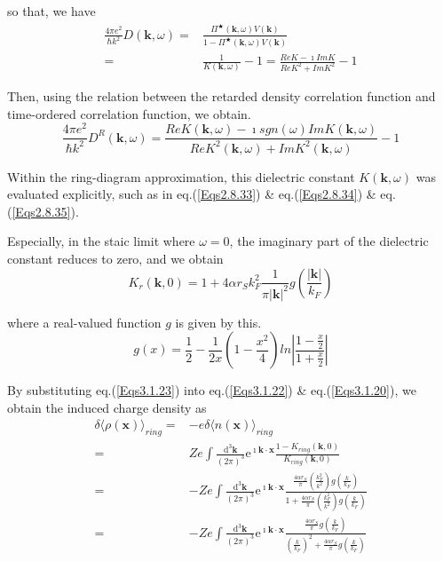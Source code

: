 so that, we have
\begin{equation} \label{Eqs3.1.21} \begin{split}
\frac{4\pi e^2}{\hbar k^2} D(\mathbf{k},\omega) =& \frac{\Pi^\bigstar(\mathbf{k},\omega)V(\mathbf{k})}{1-\Pi^\bigstar(\mathbf{k},\omega)V(\mathbf{k})}\\
=& \frac{1}{K(\mathbf{k},\omega)}-1 = \frac{Re K -\imath Im K}{ Re K^2 + Im K^2} - 1
\end{split}\end{equation}

Then, using the relation between the retarded density correlation function and time-ordered correlation function, we obtain.
\begin{equation} \label{Eqs3.1.22}
\frac{4\pi e^2}{\hbar k^2} D^R(\mathbf{k},\omega) = \frac{Re K(\mathbf{k},\omega) - \imath sgn(\omega) Im K(\mathbf{k},\omega)}{Re K^2(\mathbf{k},\omega) + Im K^2(\mathbf{k},\omega)} - 1
\end{equation}

Within the ring-diagram approximation, this dielectric constant $K(\mathbf{k},\omega)$ was evaluated explicitly, such as in eq.(\ref{Eqs2.8.33}) \& eq.(\ref{Eqs2.8.34}) \& eq.(\ref{Eqs2.8.35}).

Especially, in the staic limit where $\omega=0$, the imaginary part of the dielectric constant reduces to zero, and we obtain
\begin{equation} \label{Eqs3.1.23}
K_r(\mathbf{k},0) = 1+ 4 \alpha r_S k_F^2 \frac{1}{\pi |\mathbf{k}|^2} g\left( \frac{|\mathbf{k}|}{k_F} \right)
\end{equation}

where a real-valued function $g$ is given by this.
\begin{equation} \label{Eqs3.1.24}
g(x) = \frac{1}{2} - \frac{1}{2x}\left( 1-\frac{x^2}{4} \right) ln \left| \frac{1-\frac{x}{2}}{1+\frac{x}{2}} \right|
\end{equation}

By substituting eq.(\ref{Eqs3.1.23}) into eq.(\ref{Eqs3.1.22}) \& eq.(\ref{Eqs3.1.20}), we obtain the induced charge density as
\[ \begin{split}
\delta\langle \rho(\mathbf{x}) \rangle_{ring} =& - e \delta\langle n(\mathbf{x}) \rangle_{ring}\\
=& Z e \int \frac{\mathrm{d}^3 \mathbf{k}}{(2\pi)^3} \mathrm{e}^{\imath \mathbf{k} \cdot \mathbf{x}}\frac{1-K_{ring}(\mathbf{k},0)}{K_{ring}(\mathbf{k},0)}\\
=&-Z e \int \frac{\mathrm{d}^3 \mathbf{k}}{(2\pi)^3} \mathrm{e}^{\imath \mathbf{k} \cdot \mathbf{x}}\frac{\frac{4\alpha r_S}{\pi}\left( \frac{k_F^2}{k^2} \right)g\left( \frac{k}{k_F} \right)}{1+\frac{4\alpha r_S}{\pi}\left( \frac{k_F^2}{k^2} \right)g\left( \frac{k}{k_F} \right)}\\
=&-Z e \int \frac{\mathrm{d}^3 \mathbf{k}}{(2\pi)^3} \mathrm{e}^{\imath \mathbf{k} \cdot \mathbf{x}}\frac{\frac{4\alpha r_S}{\pi}g\left( \frac{k}{k_F} \right)}{\left( \frac{k}{k_F} \right)^2+\frac{4\alpha r_S}{\pi}g\left( \frac{k}{k_F} \right)}
\end{split} \]

